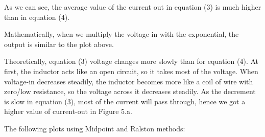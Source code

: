 \documentclass[a4paper, 12pt]{article}
\begin{document}
As we can see, the average value of the current out in equation (3) is much higher than in equation (4). \par
Mathematically, when we multiply the voltage in with the exponential, the output is similar to the plot above.\par
Theoretically, equation (3) voltage changes more slowly than for equation (4). At first, the inductor acts like an open circuit, so it takes most of the voltage. When voltage-in decreases steadily, the inductor becomes more like a coil of wire with zero/low resistance, so the voltage across it decreases steadily. As the decrement is slow in equation (3), most of the current will pass through, hence we got a higher value of current-out in Figure 5.a.

\newpage
The following plots using Midpoint and Ralston methods:
\end{document}
